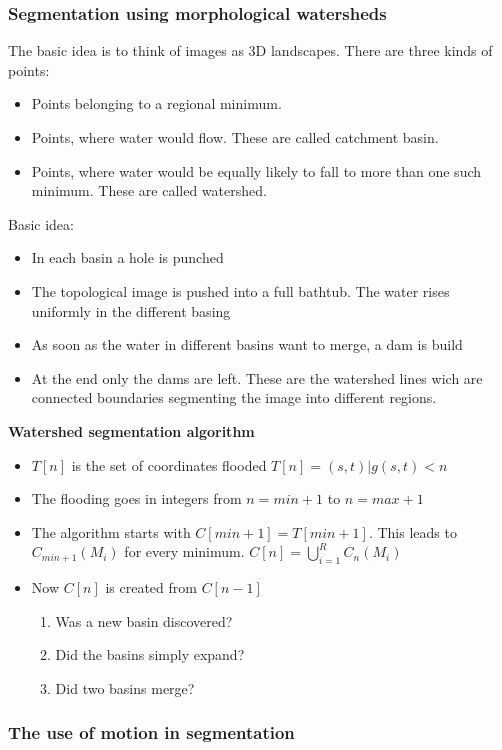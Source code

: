 \subsubsection{Segmentation using morphological watersheds}
The basic idea is to think of images as 3D landscapes. There are three kinds of points:
\begin{itemize}
\item Points belonging to a regional minimum.
\item Points, where water would flow. These are called catchment basin.
\item Points, where water would be equally likely to fall to more than one such minimum. These are called watershed.
\end{itemize}
Basic idea:
\begin{itemize}
\item In each basin a hole is punched
\item The topological image is pushed into a full bathtub. The water rises uniformly in the different basing
\item As soon as the water in different basins want to merge, a dam is build
\item At the end only the dams are left. These are the watershed lines wich are connected boundaries segmenting the image into different regions.
\end{itemize}
\textbf{Watershed segmentation algorithm}
\begin{itemize}
\item $T[n]$ is the set of coordinates flooded $T[n] = {(s,t)|g(s,t)<n}$
\item The flooding goes in integers from $n=min+1$ to $n=max+1$
\item The algorithm starts with $C[min+1]=T[min+1]$. This leads to $C_{min+1}(M_i)$ for every minimum. $C[n]=\bigcup\limits_{i=1}^{R}C_n(M_i)$
\item Now $C[n]$ is created from $C[n-1]$
\begin{enumerate}
\item Was a new basin discovered?
\item Did the basins simply expand?
\item Did two basins merge?
\end{enumerate}
\end{itemize}
\subsubsection{The use of motion in segmentation}

